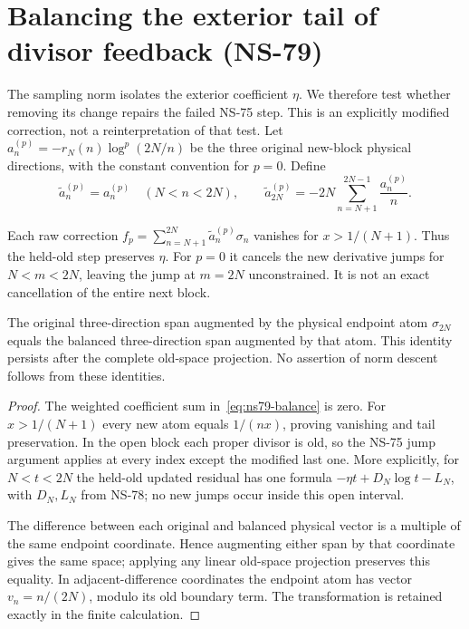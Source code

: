\section{Balancing the exterior tail of divisor feedback (NS-79)}
\label{sec:ns79-balanced-feedback}

The sampling norm isolates the exterior coefficient $\eta$. We therefore
test whether removing its change repairs the failed NS-75 step. This is
an explicitly modified correction, not a reinterpretation of that test.
Let $a_n^{(p)}=-r_N(n)\log^p(2N/n)$ be the three original new-block
physical directions, with the constant convention for $p=0$. Define
\begin{equation}
 \widetilde a_n^{(p)}=a_n^{(p)}\quad(N<n<2N),\qquad
 \widetilde a_{2N}^{(p)}=-2N\sum_{n=N+1}^{2N-1}\frac{a_n^{(p)}}n.
 \label{eq:ns79-balance}
\end{equation}

\begin{proposition}
\label{prop:ns79-balance}
Each raw correction $f_p=\sum_{n=N+1}^{2N}\widetilde a_n^{(p)}\sigma_n$
vanishes for $x>1/(N+1)$. Thus the held-old step preserves $\eta$.
For $p=0$ it cancels the new derivative jumps for $N<m<2N$, leaving
the jump at $m=2N$ unconstrained. It is not an exact cancellation of
the entire next block.

The original three-direction span augmented by the physical endpoint
atom $\sigma_{2N}$ equals the balanced three-direction span augmented
by that atom. This identity persists after the complete old-space
projection. No assertion of norm descent follows from these identities.
\end{proposition}
\begin{proof}
The weighted coefficient sum in~\eqref{eq:ns79-balance} is zero.
For $x>1/(N+1)$ every new atom equals $1/(nx)$, proving vanishing
and tail preservation. In the open block each proper divisor is old,
so the NS-75 jump argument applies at every index except the modified
last one. More explicitly, for $N<t<2N$ the held-old updated residual
has one formula $-\eta t+D_N\log t-L_N$, with $D_N,L_N$ from NS-78;
no new jumps occur inside this open interval.

The difference between each original and balanced physical vector is
a multiple of the same endpoint coordinate. Hence augmenting either
span by that coordinate gives the same space; applying any linear
old-space projection preserves this equality. In adjacent-difference
coordinates the endpoint atom has vector $v_n=n/(2N)$, modulo its
old boundary term. The transformation is retained exactly in the
finite calculation.
\end{proof}

